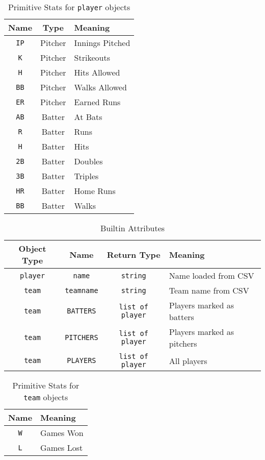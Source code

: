 \begin{table}[htdp]
\begin{center}
\begin{tabular}{|c|c|p{5cm}|}
\hline
Name & Type & Meaning\\
\hline
\texttt{IP} & Pitcher & Innings Pitched\\
\texttt{K} & Pitcher & Strikeouts\\
\texttt{H} & Pitcher & Hits Allowed\\
\texttt{BB} & Pitcher & Walks Allowed\\
\texttt{ER} & Pitcher & Earned Runs\\
\texttt{AB} & Batter & At Bats\\
\texttt{R} & Batter & Runs\\
\texttt{H} & Batter & Hits\\
\texttt{2B} & Batter & Doubles\\
\texttt{3B} & Batter & Triples\\
\texttt{HR} & Batter & Home Runs\\
\texttt{BB} & Batter & Walks\\
\hline
\end{tabular}
\end{center}
\caption{Primitive Stats for \texttt{player} objects}\label{ref_data_player_bstats}
\end{table}%


\begin{table}[htdp]
\begin{center}
\begin{tabular}{|c|c|c|p{5cm}|}
\hline
Object Type & Name & Return Type & Meaning\\
\hline
\texttt{player} & \texttt{name} & \texttt{string} & Name loaded from CSV \\
\texttt{team} & \texttt{teamname} & \texttt{string} & Team name from
CSV \\
\texttt{team} & \texttt{BATTERS} & \texttt{list of player} & Players
marked as batters \\
\texttt{team} & \texttt{PITCHERS} & \texttt{list of player} & Players
marked as pitchers \\
\texttt{team} & \texttt{PLAYERS} & \texttt{list of player} & All
players \\
\hline
\end{tabular}
\end{center}
\caption{Builtin Attributes}\label{ref_data_battr}
\end{table}%


\begin{table}[htdp]
\begin{center}
\begin{tabular}{|c|p{5cm}|}
\hline
Name & Meaning\\
\hline
\texttt{W} & Games Won\\
\texttt{L} & Games Lost\\
\hline
\end{tabular}
\end{center}
\caption{Primitive Stats for \texttt{team} objects}\label{ref_data_team_bstats}
\end{table}%

